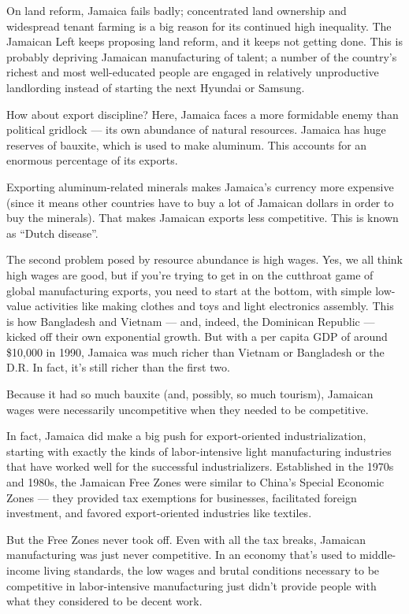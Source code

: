 \documentclass[
]{book}
\begin{document}
On land reform, Jamaica fails badly; concentrated land ownership and widespread tenant farming is a big reason for its continued high inequality. The Jamaican Left keeps proposing land reform, and it keeps not getting done. This is probably depriving Jamaican manufacturing of talent; a number of the country's richest and most well-educated people are engaged in relatively unproductive landlording instead of starting the next Hyundai or Samsung.

How about export discipline? Here, Jamaica faces a more formidable enemy than political gridlock --- its own abundance of natural resources. Jamaica has huge reserves of bauxite, which is used to make aluminum. This accounts for an enormous percentage of its exports.

Exporting aluminum-related minerals makes Jamaica's currency more expensive (since it means other countries have to buy a lot of Jamaican dollars in order to buy the minerals). That makes Jamaican exports less competitive. This is known as ``Dutch disease''.

The second problem posed by resource abundance is high wages. Yes, we all think high wages are good, but if you're trying to get in on the cutthroat game of global manufacturing exports, you need to start at the bottom, with simple low-value activities like making clothes and toys and light electronics assembly. This is how Bangladesh and Vietnam --- and, indeed, the Dominican Republic --- kicked off their own exponential growth. But with a per capita GDP of around \$10,000 in 1990, Jamaica was much richer than Vietnam or Bangladesh or the D.R. In fact, it's still richer than the first two.

Because it had so much bauxite (and, possibly, so much tourism), Jamaican wages were necessarily uncompetitive when they needed to be competitive.

In fact, Jamaica did make a big push for export-oriented industrialization, starting with exactly the kinds of labor-intensive light manufacturing industries that have worked well for the successful industrializers. Established in the 1970s and 1980s, the Jamaican Free Zones were similar to China's Special Economic Zones --- they provided tax exemptions for businesses, facilitated foreign investment, and favored export-oriented industries like textiles.

But the Free Zones never took off. Even with all the tax breaks, Jamaican manufacturing was just never competitive. In an economy that's used to middle-income living standards, the low wages and brutal conditions necessary to be competitive in labor-intensive manufacturing just didn't provide people with what they considered to be decent work.
\end{document}
